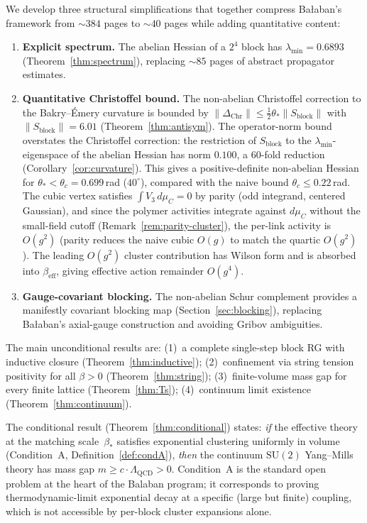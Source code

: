 \documentclass[11pt]{article}
\theoremstyle{definition}
\newcommand{\SU}{\mathrm{SU}}
\newcommand{\Lam}{\Lambda_{\mathrm{QCD}}}
\begin{document}
We develop three structural simplifications that together compress
Ba\l aban's framework from ${\sim}384$ pages to ${\sim}40$ pages while
adding quantitative content:

\begin{enumerate}[nosep]
\item \textbf{Explicit spectrum.}
The abelian Hessian of a $2^4$ block has $\lambda_{\min}=0.6893$
(Theorem~\ref{thm:spectrum}), replacing ${\sim}85$ pages of abstract
propagator estimates.

\item \textbf{Quantitative Christoffel bound.}
The non-abelian Christoffel correction to the Bakry--\'Emery curvature
is bounded by $\|\Delta_{\mathrm{Chr}}\|\le\frac{1}{2}\theta_*\|S_{\mathrm{block}}\|$
with $\|S_{\mathrm{block}}\|=6.01$
(Theorem~\ref{thm:antisym}).  The operator-norm bound overstates
the Christoffel correction: the restriction of $S_{\mathrm{block}}$
to the $\lambda_{\min}$-eigenspace of the abelian Hessian has norm
$0.100$, a $60$-fold reduction (Corollary~\ref{cor:curvature}).
This gives a positive-definite non-abelian
Hessian for $\theta_*<\theta_c=0.699$\,rad ($40^\circ$),
compared with the naive bound $\theta_c\le 0.22$\,rad.  The cubic vertex satisfies
$\int V_3\,d\mu_C=0$ by parity (odd integrand, centered Gaussian),
and since the polymer activities integrate against $d\mu_C$ without
the small-field cutoff (Remark~\ref{rem:parity-cluster}), the
per-link activity is $O(g^2)$ (parity reduces the naive cubic
$O(g)$ to match the quartic $O(g^2)$).  The leading $O(g^2)$
cluster contribution has Wilson form and is absorbed into
$\beta_{\mathrm{eff}}$, giving effective action remainder $O(g^4)$.

\item \textbf{Gauge-covariant blocking.}
The non-abelian Schur complement provides a manifestly covariant
blocking map (Section~\ref{sec:blocking}), replacing Ba\l aban's
axial-gauge construction and avoiding Gribov ambiguities.
\end{enumerate}

The main unconditional results are:
(1)~a complete single-step block RG with inductive closure
(Theorem~\ref{thm:inductive});
(2)~confinement via string tension positivity for all $\beta>0$
(Theorem~\ref{thm:string});
(3)~finite-volume mass gap for every finite lattice
(Theorem~\ref{thm:Ts});
(4)~continuum limit existence (Theorem~\ref{thm:continuum}).

The conditional result (Theorem~\ref{thm:conditional}) states:
\emph{if} the effective theory at the matching scale~$\beta_*$
satisfies exponential clustering uniformly in volume
(Condition~A, Definition~\ref{def:condA}), \emph{then} the
continuum $\SU(2)$ Yang--Mills theory has mass gap
$m\ge c\cdot\Lam>0$.  Condition~A is the standard open problem
at the heart of the Balaban program; it corresponds to proving
thermodynamic-limit exponential decay at a specific (large but
finite) coupling, which is not accessible by per-block cluster
expansions alone.
\end{document}
